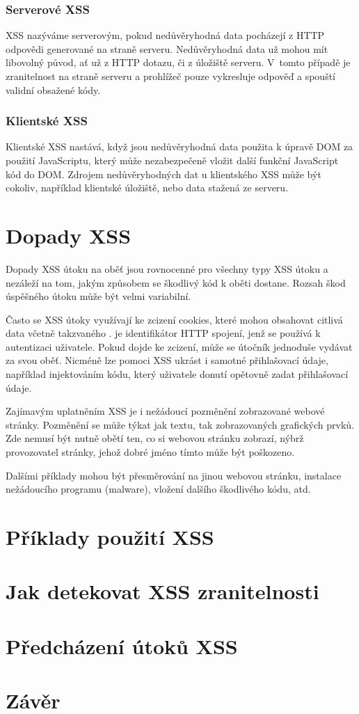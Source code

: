 \documentclass[11pt,conference]{IEEEtran}
\begin{document}
\subsubsection{Serverové XSS}
XSS nazýváme serverovým, pokud nedůvěryhodná data pocházejí z HTTP odpovědi generované na straně serveru. Nedůvěryhodná data už mohou mít libovolný původ, ať už z HTTP dotazu, či z úložiště serveru. V~tomto případě je zranitelnost na straně serveru a prohlížeč pouze vykresluje odpověď a spouští validní obsažené kódy.


\subsubsection{Klientské XSS}
Klientské XSS nastává, když jsou nedůvěryhodná data použita k úpravě DOM za použití JavaScriptu, který může nezabezpečeně vložit další funkční JavaScript kód do DOM. Zdrojem nedůvěryhodných dat u klientského XSS může být cokoliv, například klientské úložiště, nebo data stažená ze serveru.~\cite{TYPES-XSS-owasp}


\section{Dopady XSS}
Dopady XSS útoku na oběť jsou rovnocenné pro všechny typy XSS útoku a nezáleží na tom, jakým způsobem se škodlivý kód k oběti dostane. Rozsah škod úspěšného útoku může být velmi variabilní.

Často se XSS útoky využívají ke zcizení cookies, které mohou obsahovat citlivá data včetně takzvaného .  je identifikátor HTTP spojení, jenž se používá k autentizaci uživatele. Pokud dojde ke zcizení, může se útočník jednoduše vydávat za svou oběť. Nicméně lze pomoci XSS ukrást i samotné přihlašovací údaje, například injektováním kódu, který uživatele donutí opětovně zadat přihlašovací údaje. 

Zajímavým uplatněním XSS je i nežádoucí pozměnění zobrazované webové stránky. Pozměnění se může týkat jak textu, tak zobrazovaných grafických prvků. Zde nemusí být nutně obětí ten, co si webovou stránku zobrazí, nýbrž provozovatel stránky, jehož dobré jméno tímto může být poškozeno. 

Dalšími příklady mohou být přesměrování na jinou webovou stránku, instalace nežádoucího programu (malware), vložení dalšího škodlivého kódu, atd.


\section{Příklady použití XSS}
\section{Jak detekovat XSS zranitelnosti}
\section{Předcházení útoků XSS}
\section{Závěr}


\newpage
  
  
\end{document}
